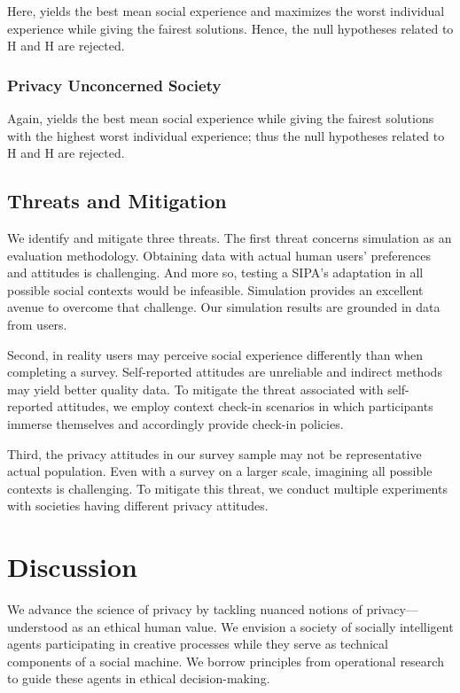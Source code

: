 Here, \frameworkAinur yields the best mean social experience and maximizes the worst individual experience while giving the fairest solutions. Hence, the null hypotheses related to H and H are rejected.

\subsubsection{Privacy Unconcerned Society}

Again, \frameworkAinur yields the best mean social experience while giving the fairest solutions with the highest worst individual experience; thus the null hypotheses related to H and H are rejected. 

\subsection{Threats and Mitigation}

We identify and mitigate three threats. 
%
The first threat concerns simulation as an evaluation methodology. Obtaining data with actual human users' preferences and attitudes is challenging. And more so, testing a SIPA's adaptation
in all possible social contexts would be infeasible. Simulation provides an excellent avenue to overcome that challenge. Our simulation results are grounded in data from users. 

Second, in reality users may perceive social experience differently than when completing a survey. Self-reported attitudes are unreliable and indirect methods may yield better quality data. To mitigate the threat associated with self-reported attitudes, we employ context check-in scenarios in which participants immerse themselves and accordingly provide check-in policies.

Third, the privacy attitudes in our survey sample may not be representative actual population. Even with a survey on a larger scale, imagining all possible contexts is challenging. To mitigate this threat, we conduct multiple experiments with societies having different privacy attitudes. 

\section{Discussion}
\label{sec:discussion}
We advance the science of privacy by tackling nuanced notions of privacy---understood as an ethical human value. We envision a society of socially intelligent agents participating in creative processes while they serve as technical components of a social machine. We borrow principles from operational research to guide these agents in ethical decision-making.

